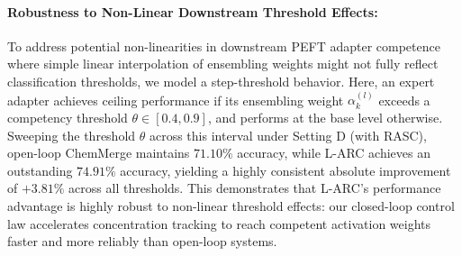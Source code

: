 \paragraph{Robustness to Non-Linear Downstream Threshold Effects:}
To address potential non-linearities in downstream PEFT adapter competence where simple linear interpolation of ensembling weights might not fully reflect classification thresholds, we model a step-threshold behavior. Here, an expert adapter achieves ceiling performance if its ensembling weight $\alpha_k^{(l)}$ exceeds a competency threshold $\theta \in [0.4, 0.9]$, and performs at the base level otherwise. Sweeping the threshold $\theta$ across this interval under Setting D (with RASC), open-loop ChemMerge maintains $71.10\%$ accuracy, while L-ARC achieves an outstanding $74.91\%$ accuracy, yielding a highly consistent absolute improvement of $+3.81\%$ across all thresholds. This demonstrates that L-ARC's performance advantage is highly robust to non-linear threshold effects: our closed-loop control law accelerates concentration tracking to reach competent activation weights faster and more reliably than open-loop systems.


